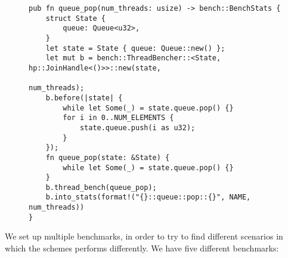 \documentclass[b5paper]{report}
\begin{document}
\begin{figure}[ht]
  \begin{lstlisting}[label=lst:benchmark,caption=Benchmarking \code{Queue::pop}
  using the self made benchmarking system with a variable number of threads.
  The closure passed to \code{.before} is executed before every call to the
  measured function and is used to initialize the state (in this case
  prepopulate the queue). The function passed to \code{.thread_bench}
  (\code{queue_pop}) is the measured function.]
pub fn queue_pop(num_threads: usize) -> bench::BenchStats {
    struct State {
        queue: Queue<u32>,
    }
    let state = State { queue: Queue::new() };
    let mut b = bench::ThreadBencher::<State, hp::JoinHandle<()>>::new(state,
                                                                       num_threads);
    b.before(|state| {
        while let Some(_) = state.queue.pop() {}
        for i in 0..NUM_ELEMENTS {
            state.queue.push(i as u32);
        }
    });
    fn queue_pop(state: &State) {
        while let Some(_) = state.queue.pop() {}
    }
    b.thread_bench(queue_pop);
    b.into_stats(format!("{}::queue::pop::{}", NAME, num_threads))
}
  \end{lstlisting}
\end{figure}

We set up multiple benchmarks, in order to try to find different scenarios in
which the schemes performs differently. We have five different benchmarks:
\end{document}
